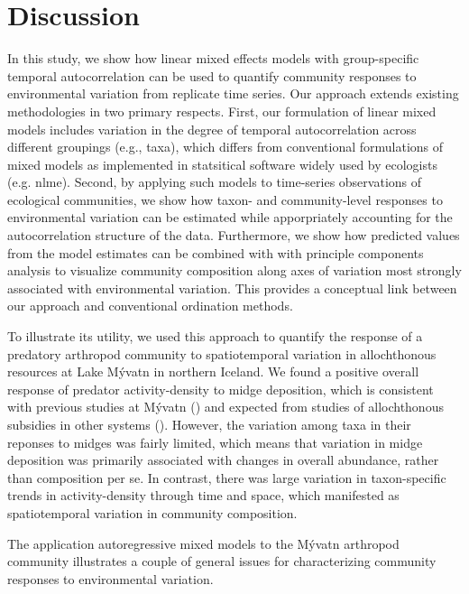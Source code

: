 

\section*{Discussion}

In this study, we show how linear mixed effects models with group-specific
temporal autocorrelation can be used to quantify community responses to environmental
variation from replicate time series.
Our approach extends existing methodologies in two primary respects.
First, our formulation of linear mixed models includes variation in
the degree of temporal autocorrelation across different groupings (e.g., taxa),
which differs from conventional formulations of mixed models as implemented in
statsitical software widely used by ecologists (e.g. nlme).
Second, by applying such models to time-series observations of ecological communities,
we show how taxon- and community-level responses to environmental variation
can be estimated while apporpriately accounting for the autocorrelation
structure of the data.
Furthermore, we show how predicted values from the model estimates can be combined with
with principle components analysis \citep[following][]{Jackson2012} to visualize
community composition along axes of variation most strongly associated with environmental
variation.
This provides a conceptual link between our approach and conventional ordination methods.

To illustrate its utility,
we used this approach to quantify the response of a predatory arthropod community to
spatiotemporal variation in allochthonous resources at
Lake M\'{y}vatn in northern Iceland.
We found a positive overall response of predator activity-density to midge deposition,
which is consistent with previous studies at M\'{y}vatn ()
and expected from studies of allochthonous subsidies in other systems ().
However, the variation among taxa in their reponses to midges was fairly limited,
which means that variation in midge deposition was primarily associated with
changes in overall abundance, rather than composition per se.
In contrast, there was large variation in taxon-specific trends in activity-density
through time and space,
which manifested as spatiotemporal variation in community composition.



The application autoregressive mixed models to the M\'{y}vatn arthropod community
illustrates a couple of general issues for characterizing community responses
to environmental variation.







